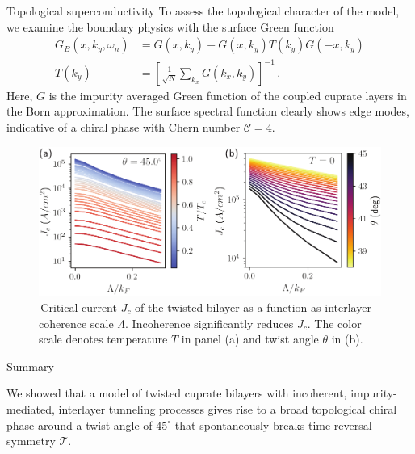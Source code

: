 \documentclass[final]{beamer}
\newlength{\onecolwid}
\begin{document}
\begin{frame}[t]
\begin{columns}[t]
\begin{column}{\onecolwid}
\begin{block}{Topological superconductivity}
To assess the topological character of the model, we examine the boundary
physics with the surface Green function
\begin{align}
     G_B(x, k_y,\omega_n) &= G(x, k_y) - G(x, k_y) 
     T(k_y)
     G(-x, k_y) 
     \nonumber
     \\
     T(k_y) &= \left[ 
     \frac{1}{\sqrt{N}} \sum_{k_x} G(k_x, k_y)
     \right]^{-1}  \,.
     \label{eq:transfm}
\end{align}
Here, $G$ is the impurity averaged Green function of the coupled cuprate layers
in the Born approximation. The surface spectral function clearly shows edge
modes, indicative of a chiral phase with Chern number $\mathcal{C}=4$.

\vspace{1cm}


\begin{figure}
	\centering
	\includegraphics[width=\columnwidth]{fig/jc.pdf}
	\caption{\sffamily \,Critical current $J_c$ of the twisted bilayer as a function as interlayer coherence scale $\Lambda$. Incoherence significantly reduces $J_c$. The color scale denotes temperature $T$ in panel (a) and twist angle $\theta$ in (b).}
	\label{fig:jc}
\end{figure}


\end{block}

\begin{block}{Summary}

	We showed that a model of twisted cuprate bilayers with incoherent,
	impurity-mediated, interlayer
tunneling processes gives rise to a broad topological chiral phase around a twist angle
of $45^\circ$ that spontaneously breaks time-reversal symmetry
$\mathcal{T}$.
\end{block}




\end{column}
\end{columns}
\end{frame}
\end{document}
